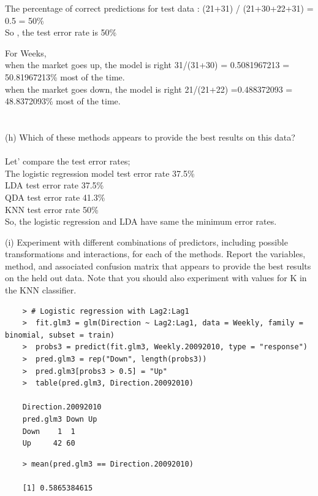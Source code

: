 \documentclass{article}
\begin{document}
The percentage of correct predictions for test data : (21+31) / (21+30+22+31) = 0.5 = 50\% \\
So , the test error rate is 50\%  

For Weeks, \\
when the market goes up, the model is right 31/(31+30) = 0.5081967213 = 50.81967213\% most of the time. \\
when the market goes down, the model is right 21/(21+22) =0.488372093 = 48.8372093\% most of the time. \\
\\
\\
(h) Which of these methods appears to provide the best results on this data? \\
\\

Let' compare the test  error rates;\\
The logistic regression model test error rate 37.5\% \\
LDA test error rate 37.5\% \\
QDA test error rate 41.3\%  \\
KNN test error rate 50\%   \\

So, the logistic regression and LDA have same the minimum error rates.\\

\newpage

(i) Experiment with different combinations of predictors, including possible transformations and interactions, for each of the methods. Report the variables, method, and associated confusion matrix that appears to provide the best results on the held out data. Note that you should also experiment with values for K in the KNN classifier.


\begin{program}
	\begin{verbatim}
	> # Logistic regression with Lag2:Lag1
	>  fit.glm3 = glm(Direction ~ Lag2:Lag1, data = Weekly, family = binomial, subset = train)
	>  probs3 = predict(fit.glm3, Weekly.20092010, type = "response")
	>  pred.glm3 = rep("Down", length(probs3))
	>  pred.glm3[probs3 > 0.5] = "Up"
	>  table(pred.glm3, Direction.20092010)
	
	Direction.20092010
	pred.glm3 Down Up
	Down    1  1
	Up     42 60
	\end{verbatim}
\end{program}

\begin{program}
	\begin{verbatim}
	> mean(pred.glm3 == Direction.20092010)

	[1] 0.5865384615
	\end{verbatim}
\end{program}
\end{document}
